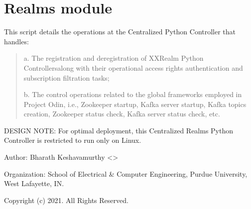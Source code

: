 \documentclass[letterpaper,10pt,english]{sphinxmanual}
\begin{document}
\section{Realms module}
\label{\detokenize{Realms:module-Realms}}\label{\detokenize{Realms:realms-module}}\label{\detokenize{Realms::doc}}
\sphinxAtStartPar
This script details the operations at the Centralized Python Controller that handles:
\begin{quote}

\sphinxAtStartPar
a. The registration and de\sphinxhyphen{}registration of XXRealm Python Controllers\textendash{}along with their operational access rights
authentication and subscription filtration tasks;

\sphinxAtStartPar
b. The control operations related to the global frameworks employed in Project Odin, i.e., Zookeeper startup,
Kafka server startup, Kafka topics creation, Zookeeper status check, Kafka server status check, etc.
\end{quote}

\sphinxAtStartPar
DESIGN NOTE: For optimal deployment, this Centralized Realms Python Controller is restricted to run only on Linux.

\sphinxAtStartPar
Author: Bharath Keshavamurthy \textless{}\textgreater{}

\sphinxAtStartPar
Organization: School of Electrical \& Computer Engineering, Purdue University, West Lafayette, IN.

\sphinxAtStartPar
Copyright (c) 2021. All Rights Reserved.
\end{document}

